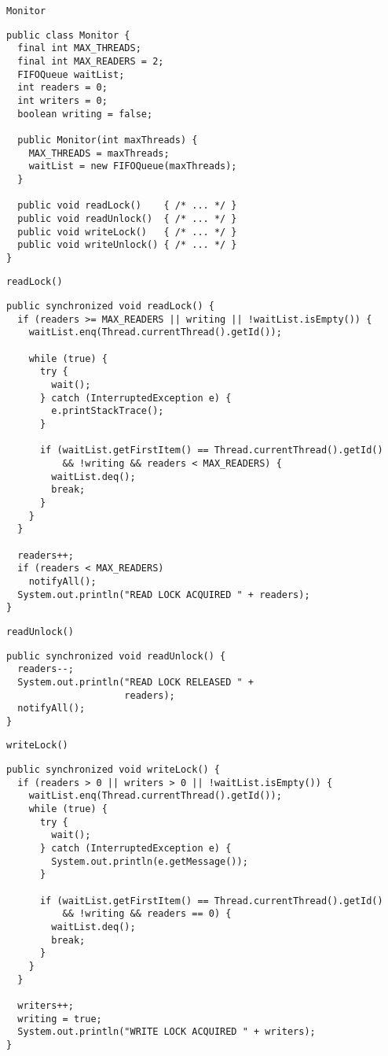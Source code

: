\begin{frame}[fragile]{\lstinline!Monitor!}
\begin{lstlisting}[basicstyle=\fontsize{10}{12}\selectfont\ttfamily]
public class Monitor {
  final int MAX_THREADS;
  final int MAX_READERS = 2;
  FIFOQueue waitList;
  int readers = 0;
  int writers = 0;
  boolean writing = false;
  
  public Monitor(int maxThreads) {
    MAX_THREADS = maxThreads;
    waitList = new FIFOQueue(maxThreads);
  }  
  
  public void readLock()    { /* ... */ }
  public void readUnlock()  { /* ... */ }
  public void writeLock()   { /* ... */ }
  public void writeUnlock() { /* ... */ }
}
\end{lstlisting}
\end{frame}

\begin{frame}[fragile]{\lstinline!readLock()!}
\begin{lstlisting}[basicstyle=\fontsize{7}{9}\selectfont\ttfamily]
public synchronized void readLock() {
  if (readers >= MAX_READERS || writing || !waitList.isEmpty()) {
    waitList.enq(Thread.currentThread().getId());

    while (true) {
      try {
        wait();
      } catch (InterruptedException e) {
        e.printStackTrace();
      }

      if (waitList.getFirstItem() == Thread.currentThread().getId()
          && !writing && readers < MAX_READERS) {
        waitList.deq();
        break;
      }
    }
  }

  readers++;
  if (readers < MAX_READERS)
    notifyAll();
  System.out.println("READ LOCK ACQUIRED " + readers);
}
\end{lstlisting}
\end{frame}

\begin{frame}[fragile]{\lstinline!readUnlock()!}
\begin{lstlisting}
public synchronized void readUnlock() {
  readers--;
  System.out.println("READ LOCK RELEASED " + 
                     readers);
  notifyAll();
}
\end{lstlisting}
\end{frame}

\begin{frame}[fragile]{\lstinline!writeLock()!}
\begin{lstlisting}[basicstyle=\fontsize{7}{9}\selectfont\ttfamily]
public synchronized void writeLock() {
  if (readers > 0 || writers > 0 || !waitList.isEmpty()) {
    waitList.enq(Thread.currentThread().getId());
    while (true) {
      try {
        wait();
      } catch (InterruptedException e) {
        System.out.println(e.getMessage());
      }

      if (waitList.getFirstItem() == Thread.currentThread().getId()
          && !writing && readers == 0) {
        waitList.deq();
        break;
      }
    }
  }
  
  writers++;
  writing = true;
  System.out.println("WRITE LOCK ACQUIRED " + writers);
}
\end{lstlisting}
\end{frame}

